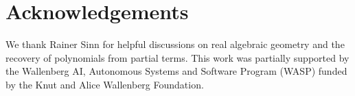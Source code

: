 \documentclass[twoside]{article}
\theoremstyle{plain}%
\theoremstyle{definition}
\theoremstyle{remark}
\begin{document}
\section*{Acknowledgements}
We thank Rainer Sinn for helpful discussions on real algebraic geometry and the recovery of polynomials from partial terms.
This work was partially supported by the Wallenberg AI, Autonomous Systems and Software Program (WASP) funded by the Knut and Alice Wallenberg Foundation. 


\printbibliography 



\end{document}
